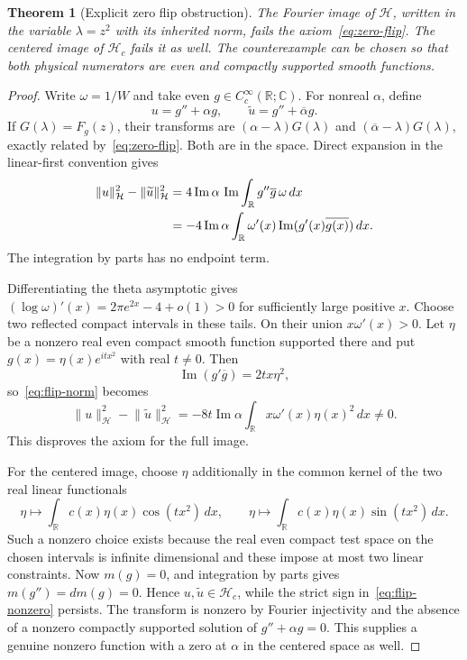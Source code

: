 \documentclass[11pt,a4paper]{article}
\numberwithin{equation}{section}
\newtheorem{theorem}{Theorem}[section]
\theoremstyle{definition}
\theoremstyle{remark}
\newcommand{\R}{\mathbb R}
\newcommand{\C}{\mathbb C}
\newcommand{\Hh}{\mathcal H}
\newcommand{\norm}[1]{\lVert #1\rVert}
\begin{document}
\begin{theorem}[Explicit zero flip obstruction]\label{thm:debranges}
The Fourier image of $\Hh$, written in the variable $\lambda=z^2$ with its inherited norm, fails the axiom~\eqref{eq:zero-flip}. The centered image of $\Hh_c$ fails it as well. The counterexample can be chosen so that both physical numerators are even and compactly supported smooth functions.
\end{theorem}
\begin{proof}
Write $\omega=1/W$ and take even $g\in C_c^\infty(\R;\C)$. For nonreal $\alpha$, define
\[
 u=g''+\alpha g,\qquad \widetilde u=g''+\overline\alpha g.
\]
If $G(\lambda)=F_g(z)$, their transforms are $(\alpha-\lambda)G(\lambda)$ and $(\overline\alpha-\lambda)G(\lambda)$, exactly related by~\eqref{eq:zero-flip}. Both are in the space. Direct expansion in the linear-first convention gives
\begin{align}
 \norm{u}_{\Hh}^2-\norm{\widetilde u}_{\Hh}^2
 &=4\operatorname{Im}\alpha\,\operatorname{Im}\int_\R g''\overline g\,\omega\,dx\notag\\
 &=-4\operatorname{Im}\alpha\int_\R\omega'(x)
           \operatorname{Im}(g'(x)\overline{g(x)})\,dx.
 \label{eq:flip-norm}
\end{align}
The integration by parts has no endpoint term.

Differentiating the theta asymptotic gives
$(\log\omega)'(x)=2\pi e^{2x}-4+o(1)>0$ for sufficiently large positive $x$. Choose two reflected compact intervals in these tails. On their union $x\omega'(x)>0$. Let $\eta$ be a nonzero real even compact smooth function supported there and put $g(x)=\eta(x)e^{itx^2}$ with real $t\ne0$. Then
\[
 \operatorname{Im}(g'\overline g)=2tx\eta^2,
\]
so~\eqref{eq:flip-norm} becomes
\begin{equation}\label{eq:flip-nonzero}
 \norm{u}_{\Hh}^2-\norm{\widetilde u}_{\Hh}^2
 =-8t\operatorname{Im}\alpha\int_\R x\omega'(x)\eta(x)^2\,dx\ne0.
\end{equation}
This disproves the axiom for the full image.

For the centered image, choose $\eta$ additionally in the common kernel of the two real linear functionals
\[
 \eta\longmapsto\int_\R c(x)\eta(x)\cos(tx^2)\,dx,
 \qquad
 \eta\longmapsto\int_\R c(x)\eta(x)\sin(tx^2)\,dx.
\]
Such a nonzero choice exists because the real even compact test space on the chosen intervals is infinite dimensional and these impose at most two linear constraints. Now $m(g)=0$, and integration by parts gives $m(g'')=dm(g)=0$. Hence $u,\widetilde u\in\Hh_c$, while the strict sign in~\eqref{eq:flip-nonzero} persists. The transform is nonzero by Fourier injectivity and the absence of a nonzero compactly supported solution of $g''+\alpha g=0$. This supplies a genuine nonzero function with a zero at $\alpha$ in the centered space as well.
\end{proof}
\end{document}
